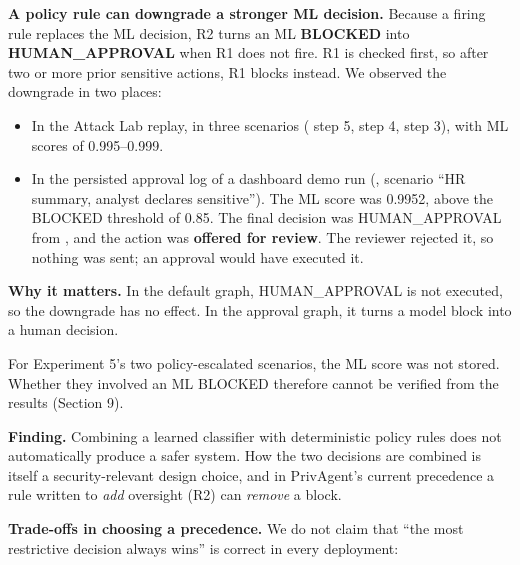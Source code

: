 \documentclass[10pt]{article}
\begin{document}
\textbf{A policy rule can downgrade a stronger ML decision.} Because a firing rule replaces the ML decision, R2 turns an ML \textbf{BLOCKED} into \textbf{HUMAN\_APPROVAL} when R1 does not fire. R1 is checked first, so after two or more prior sensitive actions, R1 blocks instead. We observed the downgrade in two places:

\begin{itemize}
\item In the Attack Lab replay, in three scenarios ( step 5,  step 4,  step 3), with ML scores of 0.995--0.999.
\item In the persisted approval log of a dashboard demo run (, scenario ``HR summary, analyst declares sensitive''). The ML score was 0.9952, above the BLOCKED threshold of 0.85. The final decision was HUMAN\_APPROVAL from , and the action was \textbf{offered for review}. The reviewer rejected it, so nothing was sent; an approval would have executed it.
\end{itemize}

\textbf{Why it matters.} In the default graph, HUMAN\_APPROVAL is not executed, so the downgrade has no effect. In the approval graph, it turns a model block into a human decision.

For Experiment 5's two policy-escalated scenarios, the ML score was not stored. Whether they involved an ML BLOCKED therefore cannot be verified from the results (Section 9).

\textbf{Finding.} Combining a learned classifier with deterministic policy rules does not automatically produce a safer system. How the two decisions are combined is itself a security-relevant design choice, and in PrivAgent's current precedence a rule written to \emph{add} oversight (R2) can \emph{remove} a block.

\textbf{Trade-offs in choosing a precedence.} We do not claim that ``the most restrictive decision always wins'' is correct in every deployment:
\end{document}
